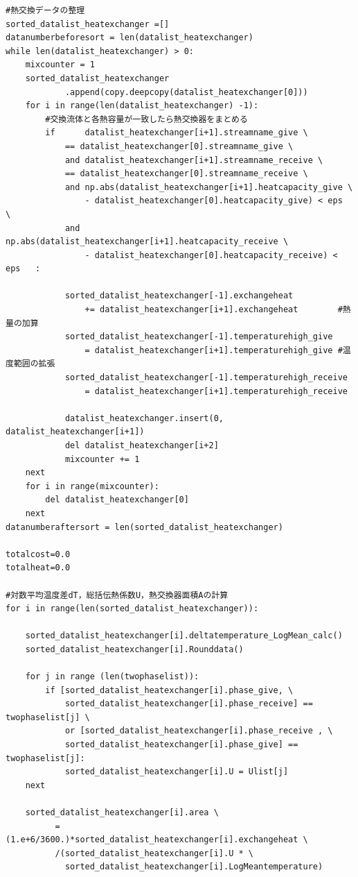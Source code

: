 \documentclass[a4j]{jsreport}
\begin{document}
\begin{lstlisting}[caption=グランドコンポジットカーブおよびTQ線図を書くコード]
#熱交換データの整理
sorted_datalist_heatexchanger =[]
datanumberbeforesort = len(datalist_heatexchanger)
while len(datalist_heatexchanger) > 0:
    mixcounter = 1
    sorted_datalist_heatexchanger
            .append(copy.deepcopy(datalist_heatexchanger[0]))
    for i in range(len(datalist_heatexchanger) -1):
        #交換流体と各熱容量が一致したら熱交換器をまとめる
        if      datalist_heatexchanger[i+1].streamname_give \
            == datalist_heatexchanger[0].streamname_give \
            and datalist_heatexchanger[i+1].streamname_receive \
            == datalist_heatexchanger[0].streamname_receive \
            and np.abs(datalist_heatexchanger[i+1].heatcapacity_give \
                - datalist_heatexchanger[0].heatcapacity_give) < eps   \
            and np.abs(datalist_heatexchanger[i+1].heatcapacity_receive \
                - datalist_heatexchanger[0].heatcapacity_receive) < eps   :

            sorted_datalist_heatexchanger[-1].exchangeheat
                += datalist_heatexchanger[i+1].exchangeheat        #熱量の加算
            sorted_datalist_heatexchanger[-1].temperaturehigh_give
                = datalist_heatexchanger[i+1].temperaturehigh_give #温度範囲の拡張
            sorted_datalist_heatexchanger[-1].temperaturehigh_receive
                = datalist_heatexchanger[i+1].temperaturehigh_receive

            datalist_heatexchanger.insert(0, datalist_heatexchanger[i+1])
            del datalist_heatexchanger[i+2]
            mixcounter += 1
    next
    for i in range(mixcounter):
        del datalist_heatexchanger[0]
    next
datanumberaftersort = len(sorted_datalist_heatexchanger)

totalcost=0.0
totalheat=0.0

#対数平均温度差dT，総括伝熱係数U，熱交換器面積Aの計算
for i in range(len(sorted_datalist_heatexchanger)):

    sorted_datalist_heatexchanger[i].deltatemperature_LogMean_calc()
    sorted_datalist_heatexchanger[i].Rounddata()

    for j in range (len(twophaselist)):
        if [sorted_datalist_heatexchanger[i].phase_give, \
            sorted_datalist_heatexchanger[i].phase_receive] == twophaselist[j] \
            or [sorted_datalist_heatexchanger[i].phase_receive , \
            sorted_datalist_heatexchanger[i].phase_give] == twophaselist[j]:
            sorted_datalist_heatexchanger[i].U = Ulist[j]
    next

    sorted_datalist_heatexchanger[i].area \
          = (1.e+6/3600.)*sorted_datalist_heatexchanger[i].exchangeheat \
          /(sorted_datalist_heatexchanger[i].U * \
            sorted_datalist_heatexchanger[i].LogMeantemperature)


\end{lstlisting}
\end{document}

